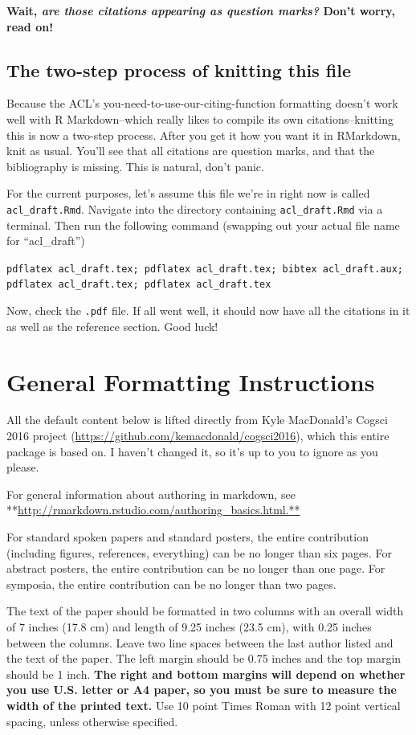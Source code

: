 \documentclass[11pt]{article}
\begin{document}
\textbf{Wait, \emph{are those citations appearing as question marks?}
Don't worry, read on!}

\subsection{The two-step process of knitting this
file}\label{the-two-step-process-of-knitting-this-file}

Because the ACL's you-need-to-use-our-citing-function formatting doesn't
work well with R Markdown--which really likes to compile its own
citations--knitting this is now a two-step process. After you get it how
you want it in RMarkdown, knit as usual. You'll see that all citations
are question marks, and that the bibliography is missing. This is
natural, don't panic.

For the current purposes, let's assume this file we're in right now is
called \texttt{acl\_draft.Rmd}. Navigate into the directory containing
\texttt{acl\_draft.Rmd} via a terminal. Then run the following command
(swapping out your actual file name for ``acl\_draft'')

\texttt{pdflatex\ acl\_draft.tex;\ pdflatex\ acl\_draft.tex;\ bibtex\ acl\_draft.aux;\ pdflatex\ acl\_draft.tex;\ pdflatex\ acl\_draft.tex}

Now, check the \texttt{.pdf} file. If all went well, it should now have
all the citations in it as well as the reference section. Good luck!

\section{General Formatting
Instructions}\label{general-formatting-instructions}

All the default content below is lifted directly from Kyle MacDonald's
Cogsci 2016 project (\url{https://github.com/kemacdonald/cogsci2016}),
which this entire package is based on. I haven't changed it, so it's up
to you to ignore as you please.

For general information about authoring in markdown, see
**\url{http://rmarkdown.rstudio.com/authoring_basics.html.**}

For standard spoken papers and standard posters, the entire contribution
(including figures, references, everything) can be no longer than six
pages. For abstract posters, the entire contribution can be no longer
than one page. For symposia, the entire contribution can be no longer
than two pages.

The text of the paper should be formatted in two columns with an overall
width of 7 inches (17.8 cm) and length of 9.25 inches (23.5 cm), with
0.25 inches between the columns. Leave two line spaces between the last
author listed and the text of the paper. The left margin should be 0.75
inches and the top margin should be 1 inch.
\textbf{The right and bottom margins will depend on whether you use
U.S. letter or A4 paper, so you must be sure to measure the width of
the printed text.} Use 10 point Times Roman with 12 point vertical
spacing, unless otherwise specified.
\end{document}

